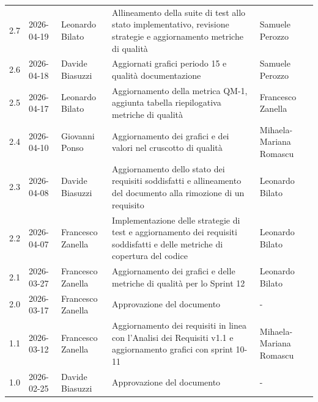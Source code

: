 \documentclass[a4paper,11pt,oneside]{scrartcl}
\begin{document}
{\begin{longtable}{@{}llp{}p{}p{}@{}}
        2.7               & 2026-04-19    & Leonardo Bilato         & Allineamento della suite di test allo stato implementativo, revisione strategie e aggiornamento metriche di qualità & Samuele Perozzo         \\
        2.6               & 2026-04-18    & Davide Biasuzzi         & Aggiornati grafici periodo 15 e qualità documentazione & Samuele Perozzo     \\
        2.5               & 2026-04-17    & Leonardo Bilato         & Aggiornamento della metrica QM-1, aggiunta tabella riepilogativa metriche di qualità                                                             & Francesco Zanella     \\
        2.4               & 2026-04-10    & Giovanni Ponso          & Aggiornamento dei grafici e dei valori nel cruscotto di qualità                                                                                          & Mihaela-Mariana Romascu \\
        2.3               & 2026-04-08    & Davide Biasuzzi         & Aggiornamento dello stato dei requisiti soddisfatti e allineamento del documento alla rimozione di un requisito                                          & Leonardo Bilato         \\
        2.2               & 2026-04-07    & Francesco Zanella       & Implementazione delle strategie di test e aggiornamento dei requisiti soddisfatti e delle metriche di copertura del codice                               & Leonardo Bilato         \\
        2.1               & 2026-03-27    & Francesco Zanella       & Aggiornamento dei grafici e delle metriche di qualità per lo Sprint 12                                                                                   & Leonardo Bilato         \\
        2.0               & 2026-03-17    & Francesco Zanella       & Approvazione del documento                                                                                                                               & -                       \\
        1.1               & 2026-03-12    & Francesco Zanella       & Aggiornamento dei requisiti in linea con l'Analisi dei Requisiti v1.1 e aggiornamento grafici con sprint 10-11                                           & Mihaela-Mariana Romascu \\
        1.0               & 2026-02-25    & Davide Biasuzzi         & Approvazione del documento                                                                                                                               & -                       \\

\end{longtable}}
\end{document}
